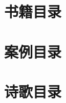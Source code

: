 \documentclass{ctexart}
\begin{document}
\section{书籍目录}
\renewcommand*{\listtheoremname}{}
\begin{multicols}{2}
    \listoftheorems[ignoreall, show = book]
\end{multicols}

\section{案例目录}
\renewcommand*{\listtheoremname}{}
\begin{multicols}{2}
    \listoftheorems[ignoreall, show = case]
\end{multicols}

\section{诗歌目录}
\renewcommand*{\listtheoremname}{}
\begin{multicols}{2}
    \listoftheorems[ignoreall, show = poem]
\end{multicols}
\end{document}
